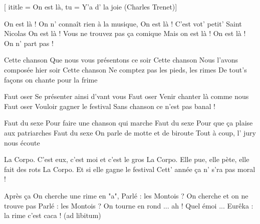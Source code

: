  [
ititle = {On est là},
tu = {Y'a d' la joie (Charles Trenet)}]


\beginverse
On est là !
On n' connaît rien à la musique,
On est là !
C'est vot' petit' Saint Nicolas
On est là !
Vous ne trouvez pas ça comique
Mais on est là ! On est là ! On n' part pas !
\endverse

\beginverse
Cette chanson
Que nous vous présentons ce soir
Cette chanson
Nous l'avons composée hier soir
Cette chanson
Ne comptez pas les pieds, les rimes
De tout's façons on chante pour la frime
\endverse

\beginverse
Faut oser
Se présenter ainsi d'vant vous
Faut oser
Venir chanter là comme nous
Faut oser
Vouloir gagner le festival
Sans chanson ce n'est pas banal !
\endverse

\beginverse
Faut du sexe
Pour faire une chanson qui marche
Faut du sexe
Pour que ça plaise aux patriarches
Faut du sexe
On parle de motte et de biroute
Tout à coup, l' jury nous écoute
\endverse

\beginverse
La Corpo.
C'est eux, c'est moi et c'est le gros
La Corpo.
Elle pue, elle pète, elle fait des rots
La Corpo.
Et si elle gagne le festival
Cett' année ça n' s'ra pas moral !
\endverse

\beginverse
Après ça
On cherche une rime en "a",
Parlé : les Montois ?
On cherche et on ne trouve pas
Parlé : les Montois ?
On tourne en rond ... ah ! Quel émoi ...
Eurêka : la rime c'est caca ! (ad libitum)
\endverse

\endsong
